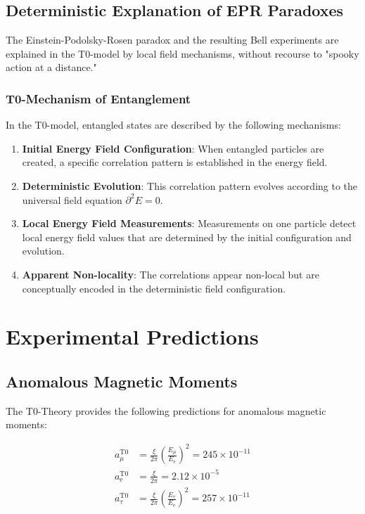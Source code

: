 \documentclass[12pt,a4paper]{article}
\newcommand{\ee}{\text{$\mathrm{e}$}}
\newcommand{\mmu}{\text{$\mu$}}
\newcommand{\ttau}{\text{$\tau$}}
\theoremstyle{definition}
\begin{document}
	\subsection{Deterministic Explanation of EPR Paradoxes}
	
	The Einstein-Podolsky-Rosen paradox and the resulting Bell experiments are explained in the T0-model by local field mechanisms, without recourse to "spooky action at a distance."
	
	\subsubsection{T0-Mechanism of Entanglement}
	
	In the T0-model, entangled states are described by the following mechanisms:
	
	\begin{enumerate}
		\item \textbf{Initial Energy Field Configuration}: When entangled particles are created, a specific correlation pattern is established in the energy field.
		
		\item \textbf{Deterministic Evolution}: This correlation pattern evolves according to the universal field equation $\partial^2 E = 0$.
		
		\item \textbf{Local Energy Field Measurements}: Measurements on one particle detect local energy field values that are determined by the initial configuration and evolution.
		
		\item \textbf{Apparent Non-locality}: The correlations appear non-local but are conceptually encoded in the deterministic field configuration.
	\end{enumerate}
	
	\section{Experimental Predictions}
	
	\subsection{Anomalous Magnetic Moments}
	
	The T0-Theory provides the following predictions for anomalous magnetic moments:
	
	\begin{align}
		a_{\mmu}^{\text{T0}} &= \frac{\xi}{2\pi} \left(\frac{E_{\mmu}}{E_{\ee}}\right)^2 = 245 \times 10^{-11}\\
		a_{\ee}^{\text{T0}} &= \frac{\xi}{2\pi} = 2.12 \times 10^{-5}\\
		a_{\ttau}^{\text{T0}} &= \frac{\xi}{2\pi} \left(\frac{E_{\ttau}}{E_{\ee}}\right)^2 = 257 \times 10^{-11}
	\end{align}
	
\end{document}
